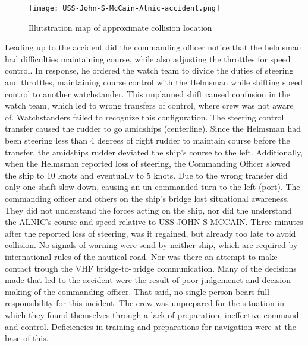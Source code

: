 \begin{wrapfigure}{L}{0.6\textwidth}
	\centering
	\texttt{[image: USS-John-S-McCain-Alnic-accident.png]}
	\caption{Illutstration map of approximate collision location}
	\label{fig:Accident-USS-John-S-McCain-Alnic}
\end{wrapfigure}

Leading up to the accident did the commanding officer notice that the helmsman had difficulties maintaining course, while also adjusting the throttles for speed control. In response, he ordered the watch team to divide the duties of steering and throttles, maintaining course control with the Helmsman while shifting speed control to another watchstander. This unplanned shift caused confusion in the watch team, which led to wrong transfers of control, where crew was not aware of. 
Watchstanders failed to recognize this configuration. The steering control transfer caused the rudder to go amidships (centerline). Since the Helmsman had been steering less than 4 degrees of right rudder to maintain course before the transfer, the amidships rudder deviated the ship’s course to the left. Additionally, when the Helmsman reported loss of steering, the Commanding Officer slowed the ship to 10 knots and eventually to 5 knots. Due to the wrong transfer did only one shaft slow down, causing an un-commanded turn to the left (port). The commanding officer and others on the ship's bridge lost situational awareness. They did not understand the forces acting on the ship, nor did the understand the ALNIC's course and speed relative to USS JOHN S MCCAIN. Three minutes after the reported loss of steering, was it regained, but already too late to avoid collision. No signals of warning were send by neither ship, which are required by international rules of the nautical road. Nor was there an attempt to make contact trough the \ac{VHF} bridge-to-bridge communication.
Many of the decisions made that led to the accident were the result of poor judgemenet and decision making of the commanding officer. That said, no single person bears full responsibility for this incident. The crew was unprepared for the situation in which they found themselves through a lack of preparation, ineffective command and control. Deficiencies in training and preparations for navigation were at the base of this. \cite{USNavy2017}